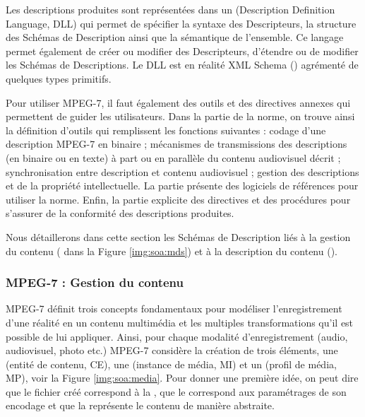 Les descriptions produites sont représentées dans un  (Description Definition Language, DLL) qui permet de spécifier la syntaxe des Descripteurs, la structure des Schémas de Description ainsi que la sémantique de l'ensemble.
Ce langage permet également de créer ou modifier des Descripteurs, d'étendre ou de modifier les Schémas de Descriptions. 
Le DLL est en réalité XML Schema (\cite{Fallside2004}) agrémenté de quelques types primitifs.

Pour utiliser MPEG-7, il faut également des outils et des directives annexes qui permettent de guider les utilisateurs. 
Dans la partie  de la norme, on trouve ainsi la définition d'outils qui remplissent les fonctions suivantes : codage d'une description MPEG-7 en binaire ; mécanismes de transmissions des descriptions (en binaire ou en texte) à part ou en parallèle du contenu audiovisuel décrit ;  synchronisation entre description et contenu audiovisuel ; gestion des descriptions et de la propriété intellectuelle. 
La partie  présente des logiciels de références pour utiliser la norme.
Enfin, la partie  explicite des directives et des procédures pour s'assurer de la conformité des descriptions produites.

Nous détaillerons dans cette section les Schémas de Description liés à la gestion du contenu ( dans la Figure \ref{img:soa:mds}) et à la description du contenu ().\\


\subsubsection{MPEG-7 : Gestion du contenu}\label{sec:mpeg7-gc}
MPEG-7 définit trois concepts fondamentaux pour modéliser l'enregistrement d'une réalité en un contenu multimédia et les multiples transformations qu'il est possible de lui appliquer. 
Ainsi, pour chaque modalité d'enregistrement (audio, audiovisuel, photo etc.) MPEG-7 considère la création de trois éléments, une  (entité de contenu, CE), une  (instance de média, MI) et un  (profil de média, MP), voir la Figure \ref{img:soa:media}.
Pour donner une première idée, on peut dire que le fichier créé correspond à la , que le  correspond aux paramétrages de son encodage et que la  représente le contenu de manière abstraite.

